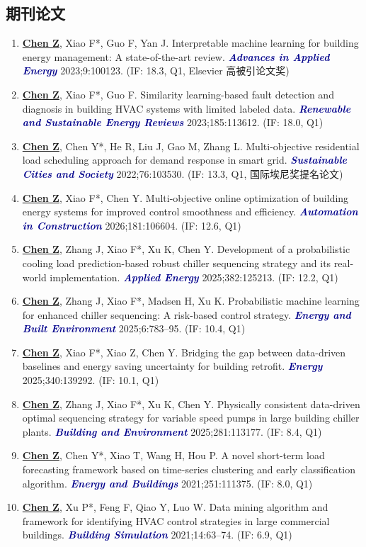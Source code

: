 \documentclass[11pt,a4paper]{article}
\newcounter{cvbookmark}
\newcommand{\cvoutline}[2]{%
  \stepcounter{cvbookmark}%
  \pdfbookmark[#1]{#2}{cvbookmark.\thecvbookmark}%
}
\newcommand{\cvsubsection}[2]{%
  \cvoutline{2}{#1}%
  \subsection*{#2}%
}
\newcommand{\me}[1]{\underline{\textbf{#1}}}
\newcommand{\journal}[1]{\textcolor{darkblue}{\textbf{\textit{#1}}}}
\begin{document}
\cvsubsection{期刊论文}{\color{darkblue}期刊论文}
\begin{enumerate}
\item \me{Chen Z}, Xiao F*, Guo F, Yan J. Interpretable machine learning for building energy management: A state-of-the-art review. \journal{Advances in Applied Energy} 2023;9:100123. (IF: 18.3, Q1, Elsevier 高被引论文奖)
\item \me{Chen Z}, Xiao F*, Guo F. Similarity learning-based fault detection and diagnosis in building HVAC systems with limited labeled data. \journal{Renewable and Sustainable Energy Reviews} 2023;185:113612. (IF: 18.0, Q1)
\item \me{Chen Z}, Chen Y*, He R, Liu J, Gao M, Zhang L. Multi-objective residential load scheduling approach for demand response in smart grid. \journal{Sustainable Cities and Society} 2022;76:103530. (IF: 13.3, Q1, 国际埃尼奖提名论文)
\item \me{Chen Z}, Xiao F*, Chen Y. Multi-objective online optimization of building energy systems for improved control smoothness and efficiency. \journal{Automation in Construction} 2026;181:106604. (IF: 12.6, Q1)
\item \me{Chen Z}, Zhang J, Xiao F*, Xu K, Chen Y. Development of a probabilistic cooling load prediction-based robust chiller sequencing strategy and its real-world implementation. \journal{Applied Energy} 2025;382:125213. (IF: 12.2, Q1)
\item \me{Chen Z}, Zhang J, Xiao F*, Madsen H, Xu K. Probabilistic machine learning for enhanced chiller sequencing: A risk-based control strategy. \journal{Energy and Built Environment} 2025;6:783--95. (IF: 10.4, Q1)
\item \me{Chen Z}, Xiao F*, Xiao Z, Chen Y. Bridging the gap between data-driven baselines and energy saving uncertainty for building retrofit. \journal{Energy} 2025;340:139292. (IF: 10.1, Q1)
\item \me{Chen Z}, Zhang J, Xiao F*, Xu K, Chen Y. Physically consistent data-driven optimal sequencing strategy for variable speed pumps in large building chiller plants. \journal{Building and Environment} 2025;281:113177. (IF: 8.4, Q1)
\item \me{Chen Z}, Chen Y*, Xiao T, Wang H, Hou P. A novel short-term load forecasting framework based on time-series clustering and early classification algorithm. \journal{Energy and Buildings} 2021;251:111375. (IF: 8.0, Q1)
\item \me{Chen Z}, Xu P*, Feng F, Qiao Y, Luo W. Data mining algorithm and framework for identifying HVAC control strategies in large commercial buildings. \journal{Building Simulation} 2021;14:63--74. (IF: 6.9, Q1)

\end{enumerate}
\end{document}

